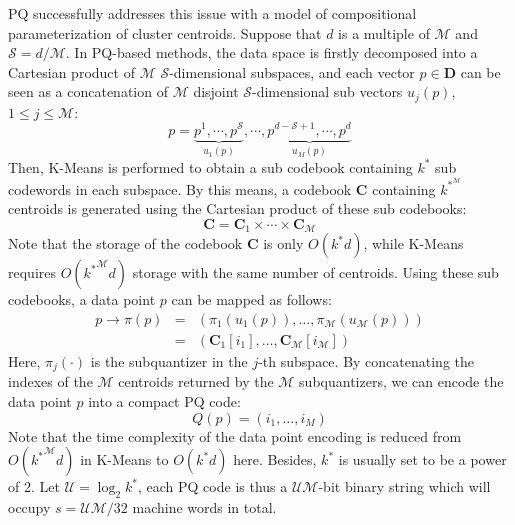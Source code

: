 \documentclass[twocolumn]{svjour3}          %
\begin{document}
PQ successfully addresses this issue with a model of compositional parameterization of cluster centroids. Suppose that $d$ is a multiple of $\mathcal{M}$ and $\mathcal{S}=d/\mathcal{M}$. In PQ-based methods, the data space is firstly decomposed into a Cartesian product of $\mathcal{M}$ $\mathcal{S}$-dimensional subspaces, and each vector $p\in \textbf{D}$ can be seen as a concatenation of $\mathcal{M}$ disjoint $\mathcal{S}$-dimensional sub vectors $u_j(p)$, $1\le j \le \mathcal{M}$:
$$
p = \underbrace {{p^1}, \cdots ,{p^\mathcal{S}}}_{{u_1}\left( p \right)}, \cdots ,\underbrace {{p^{d - \mathcal{S} + 1}}, \cdots ,{p^d}}_{{u_{M}\left( p \right)}}
$$
Then, K-Means is performed to obtain a sub codebook containing $k^*$ sub codewords in each subspace. By this means, a codebook $\textbf{C}$ containing $k^*^\mathcal{M}$ centroids is generated using the Cartesian product of these sub codebooks:
$$
\textbf{C}=\textbf{C}_1 \times \cdots \times \textbf{C}_{\mathcal{M}}
$$
Note that the storage of the codebook $\textbf{C}$ is only $O(k^* d)$, while K-Means requires $O({k^*}^\mathcal{M}d)$ storage with the same number of centroids. Using these sub codebooks, a data point $p$ can be mapped as follows:
$$
\begin{array}{*{20}{l}}
{p \to \pi \left( p \right)}& = &{\left( {{\pi _1}\left( {{u_1}\left( p \right)} \right), \ldots ,{\pi _\mathcal{M}}\left( {{u_\mathcal{M}}\left( p \right)} \right)} \right)}\\
{}& = &{\left( {{\textbf{C}_1}[{i_1}], \ldots ,{\textbf{C}_\mathcal{M}}[{i_\mathcal{M}}]} \right)}
\end{array}
$$
Here, $\pi_j(\cdot)$ is the subquantizer in the $j$-th subspace. By concatenating the indexes of the $\mathcal{M}$ centroids returned by the $\mathcal{M}$ subquantizers, we can encode the data point $p$ into a compact PQ code:
$$
Q\left( p \right) = \left( {{i_1}, \ldots ,{i_M}} \right)
$$
Note that the time complexity of the data point encoding is reduced from $O({k^*}^\mathcal{M}d)$ in K-Means to $O(k^* d)$ here. Besides, $k^*$ is usually set to be a power of 2. Let $\mathcal{U}=\log_2k^*$, each PQ code is thus a $\mathcal{UM}$-bit binary string which will occupy $s=\mathcal{UM}/32$ machine words in total.
\end{document}
